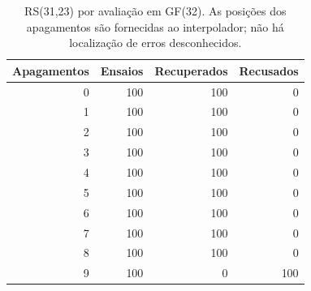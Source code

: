 \begin{table}[htbp]
\centering\small
\begin{tabular}{rrrr}
\toprule
Apagamentos & Ensaios & Recuperados & Recusados\\
\midrule
0 & 100 & 100 & 0\\
1 & 100 & 100 & 0\\
2 & 100 & 100 & 0\\
3 & 100 & 100 & 0\\
4 & 100 & 100 & 0\\
5 & 100 & 100 & 0\\
6 & 100 & 100 & 0\\
7 & 100 & 100 & 0\\
8 & 100 & 100 & 0\\
9 & 100 & 0 & 100\\
\bottomrule
\end{tabular}
\caption{RS(31,23) por avaliação em GF(32). As posições dos apagamentos são fornecidas ao interpolador; não há localização de erros desconhecidos.}
\end{table}
